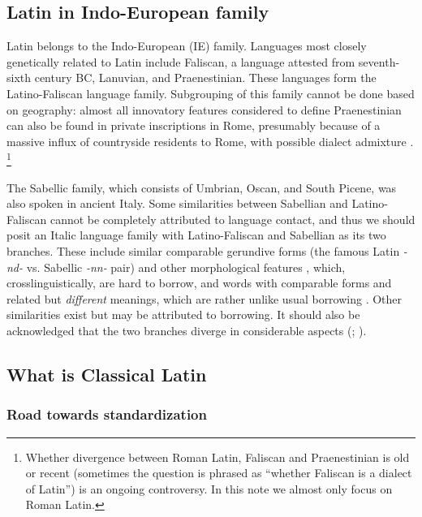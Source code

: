 \documentclass[a4paper, oneside, 12pt]{report}
\newcommand*{\citepage}[1]{p.~{#1}}
\newcommand*{\citepages}[1]{pp.~{#1}}
\newcommand{\form}[1]{\emph{#1}}
\begin{document}
\subsection{Latin in Indo-European family}

Latin belongs to the Indo-European (IE) family.
Languages most closely genetically related to Latin include Faliscan,
a language attested from seventh-sixth century BC,
Lanuvian, and Praenestinian.
These languages form the Latino-Faliscan language family.
Subgrouping of this family cannot be done based on geography:
almost all innovatory features considered to define Praenestinian can also be found in private inscriptions in Rome,
presumably because of a massive influx of countryside residents to Rome, with possible dialect admixture \citep[\citepage{126}]{clackson2011blackwell}.%
\footnote{
    Whether divergence between Roman Latin, Faliscan and Praenestinian is old or recent (sometimes the question is phrased as ``whether Faliscan is a dialect of Latin'') is an ongoing controversy.
    In this note we almost only focus on Roman Latin. 
}

The Sabellic family, which consists of Umbrian, Oscan, and South Picene,
was also spoken in ancient Italy.
Some similarities between Sabellian and Latino-Faliscan cannot be completely attributed to language contact,
and thus we should posit an Italic language family
with Latino-Faliscan and Sabellian as its two branches.
These include similar comparable gerundive forms (the famous Latin \form{-nd-} vs. Sabellic \form{-nn-} pair)
and other morphological features \citep[\citepages{66-68}]{clackson2011blackwell}, which, crosslinguistically, are hard to borrow,
and words with comparable forms and related but \emph{different} meanings,
which are rather unlike usual borrowing \citep[\citepages{121}]{weiss2022italic}.
Other similarities exist but may be attributed to borrowing.
It should also be acknowledged that the two branches diverge in considerable aspects 
(\citealt[\citepages{122}]{weiss2022italic}; \citealt[\citepages{69-72}]{clackson2011blackwell}).

\subsection{What is Classical Latin}

\subsubsection{Road towards standardization}
\end{document}

